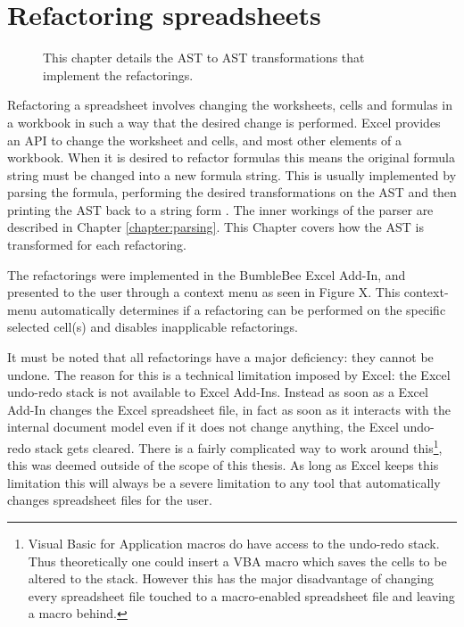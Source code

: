 \chapter{Refactoring spreadsheets}
\label{chapter:implementingrefactorings}

\noindent
\begin{figure}[h!]
\hspace*{0.003\textwidth}

\caption{This chapter details the AST to AST transformations that implement the refactorings.}
\end{figure}

Refactoring a spreadsheet involves changing the worksheets, cells and formulas in a workbook in such a way that the desired change is performed.
Excel provides an API to change the worksheet and cells, and most other elements of a workbook.
When it is desired to refactor formulas this means the original formula string must be changed into a new formula string.
This is usually implemented by parsing the formula, performing the desired transformations on the AST and then printing the AST back to a string form \cite{fowler1999refactoring}.
The inner workings of the parser are described in Chapter \ref{chapter:parsing}.
This Chapter covers how the AST is transformed for each refactoring.

The refactorings were implemented in the BumbleBee Excel Add-In, and presented to the user through a context menu as seen in Figure X.
This context-menu automatically determines if a refactoring can be performed on the specific selected cell(s) and disables inapplicable refactorings.

It must be noted that all refactorings have a major deficiency: they cannot be undone.
The reason for this is a technical limitation imposed by Excel: the Excel undo-redo stack is not available to Excel Add-Ins.
Instead as soon as a Excel Add-In changes the Excel spreadsheet file, in fact as soon as it interacts with the internal document model even if it does not change anything, the Excel undo-redo stack gets cleared.
There is a fairly complicated way to work around this\footnote{Visual Basic for Application macros do have access to the undo-redo stack. Thus theoretically one could insert a VBA macro which saves the cells to be altered to the stack. However this has the major disadvantage of changing every spreadsheet file touched to a macro-enabled spreadsheet file and leaving a macro behind.}, this was deemed outside of the scope of this thesis.
As long as Excel keeps this limitation this will always be a severe limitation to any tool that automatically changes spreadsheet files for the user.


